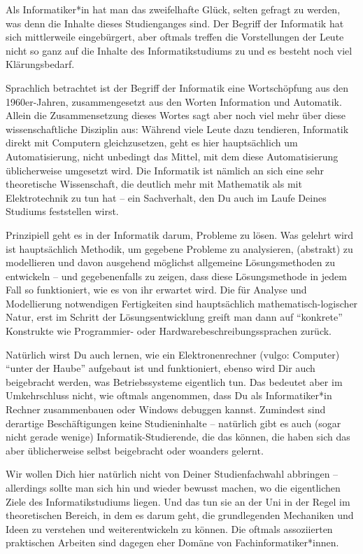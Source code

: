 {Als Informatiker*in hat man das zweifelhafte Glück, selten gefragt zu werden, was denn die Inhalte dieses Studienganges sind. Der Begriff der Informatik hat sich mittlerweile eingebürgert, aber oftmals treffen die Vorstellungen der Leute nicht so ganz auf die Inhalte des Informatikstudiums zu und es besteht noch viel Klärungsbedarf.
}
{Sprachlich betrachtet ist der Begriff der Informatik eine Wortschöpfung aus den 1960er-Jahren, zusammengesetzt aus den Worten Information und Automatik. Allein die Zusammensetzung dieses Wortes sagt aber noch viel mehr über diese wissenschaftliche Disziplin aus: Während viele Leute dazu tendieren, Informatik direkt mit Computern gleichzusetzen, geht es hier hauptsächlich um Automatisierung, nicht unbedingt das Mittel, mit dem diese Automatisierung üblicherweise umgesetzt wird. Die Informatik ist nämlich an sich eine sehr theoretische Wissenschaft, die deutlich mehr mit Mathematik als mit Elektrotechnik zu tun hat – ein Sachverhalt, den Du auch im Laufe Deines Studiums feststellen wirst.

Prinzipiell geht es in der Informatik darum, Probleme zu lösen. Was gelehrt wird ist hauptsächlich Methodik, um gegebene Probleme zu analysieren, (abstrakt) zu modellieren und davon ausgehend möglichst allgemeine Lösungsmethoden zu entwickeln – und gegebenenfalls zu zeigen, dass diese Lösungsmethode in jedem Fall so funktioniert, wie es von ihr erwartet wird. Die für Analyse und Modellierung notwendigen Fertigkeiten sind hauptsächlich mathematisch-logischer Natur, erst im Schritt der Lösungsentwicklung greift man dann auf "`konkrete"' Konstrukte wie Programmier- oder Hardwarebeschreibungssprachen zurück.

Natürlich wirst Du auch lernen, wie ein Elektronenrechner (vulgo: Computer) "`unter der Haube"' aufgebaut ist und funktioniert, ebenso wird Dir auch beigebracht werden, was Betriebssysteme eigentlich tun. Das bedeutet aber im Umkehrschluss nicht, wie oftmals angenommen, dass Du als Informatiker*in Rechner zusammenbauen oder Windows debuggen kannst. Zumindest sind derartige Beschäftigungen keine Studieninhalte – natürlich gibt es auch (sogar nicht gerade wenige) Informatik-Studierende, die das können, die haben sich das aber üblicherweise selbst beigebracht oder woanders gelernt.

Wir wollen Dich hier natürlich nicht von Deiner Studienfachwahl abbringen – allerdings sollte man sich hin und wieder bewusst machen, wo die eigentlichen Ziele des Informatikstudiums liegen. Und das tun sie an der Uni in der Regel im theoretischen Bereich, in dem es darum geht, die grundlegenden Mechaniken und Ideen zu verstehen und weiterentwickeln zu können. Die oftmals assoziierten praktischen Arbeiten sind dagegen eher Domäne von Fachinformatiker*innen.
}
{}

\vfill
{}

\newpage